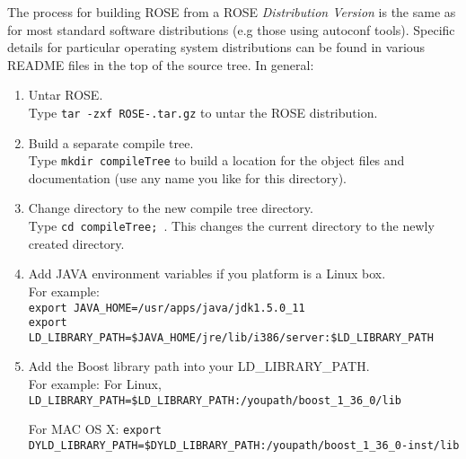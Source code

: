    The process for building ROSE from a ROSE {\em Distribution Version} is the same as for
   most standard software distributions (e.g those using autoconf tools). Specific details for particular
   operating system distributions can be found in various README files in the top of the source tree. In
   general:
\begin{enumerate}
     \item Untar ROSE. \\
           Type {\tt tar -zxf ROSE-\VersionNumber.tar.gz} to untar the ROSE distribution.
     \item Build a separate compile tree. \\
           Type {\tt mkdir compileTree} to build a location for the object files and
           documentation (use any name you like for this directory).
     \item Change directory to the new compile tree directory. \\
           Type {\tt cd compileTree; }. This changes the current directory to the newly
           created directory.
     \item Add JAVA environment variables if you platform is a Linux box. \\
           For example:\\
           {\tt export JAVA\_HOME=/usr/apps/java/jdk1.5.0\_11} \\
           {\tt export LD\_LIBRARY\_PATH=\$JAVA\_HOME/jre/lib/i386/server:\$LD\_LIBRARY\_PATH}

     \item Add the Boost library path into your LD\_LIBRARY\_PATH.\\
           For example: For Linux, 
           {\tt LD\_LIBRARY\_PATH=\$LD\_LIBRARY\_PATH:/youpath/boost\_1\_36\_0/lib} 

           For MAC OS X: 
           {\tt export DYLD\_LIBRARY\_PATH=\$DYLD\_LIBRARY\_PATH:/youpath/boost\_1\_36\_0-inst/lib}


\end{enumerate}
